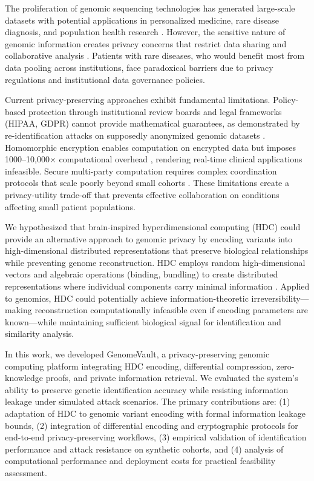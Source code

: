 \documentclass[11pt,letterpaper]{article}
\begin{document}
The proliferation of genomic sequencing technologies has generated large-scale datasets with potential applications in personalized medicine, rare disease diagnosis, and population health research \cite{birney2021}. However, the sensitive nature of genomic information creates privacy concerns that restrict data sharing and collaborative analysis \cite{gymrek2013,erlich2014}. Patients with rare diseases, who would benefit most from data pooling across institutions, face paradoxical barriers due to privacy regulations and institutional data governance policies.

Current privacy-preserving approaches exhibit fundamental limitations. Policy-based protection through institutional review boards and legal frameworks (HIPAA, GDPR) cannot provide mathematical guarantees, as demonstrated by re-identification attacks on supposedly anonymized genomic datasets \cite{homer2008,im2012}. Homomorphic encryption enables computation on encrypted data but imposes 1000--10,000$\times$ computational overhead \cite{kim2015,chen2016}, rendering real-time clinical applications infeasible. Secure multi-party computation requires complex coordination protocols that scale poorly beyond small cohorts \cite{kamm2013}. These limitations create a privacy-utility trade-off that prevents effective collaboration on conditions affecting small patient populations.

We hypothesized that brain-inspired hyperdimensional computing (HDC) could provide an alternative approach to genomic privacy by encoding variants into high-dimensional distributed representations that preserve biological relationships while preventing genome reconstruction. HDC employs random high-dimensional vectors and algebraic operations (binding, bundling) to create distributed representations where individual components carry minimal information \cite{karunaratne2021}. Applied to genomics, HDC could potentially achieve information-theoretic irreversibility---making reconstruction computationally infeasible even if encoding parameters are known---while maintaining sufficient biological signal for identification and similarity analysis.

In this work, we developed GenomeVault, a privacy-preserving genomic computing platform integrating HDC encoding, differential compression, zero-knowledge proofs, and private information retrieval. We evaluated the system's ability to preserve genetic identification accuracy while resisting information leakage under simulated attack scenarios. The primary contributions are: (1) adaptation of HDC to genomic variant encoding with formal information leakage bounds, (2) integration of differential encoding and cryptographic protocols for end-to-end privacy-preserving workflows, (3) empirical validation of identification performance and attack resistance on synthetic cohorts, and (4) analysis of computational performance and deployment costs for practical feasibility assessment.
\end{document}
